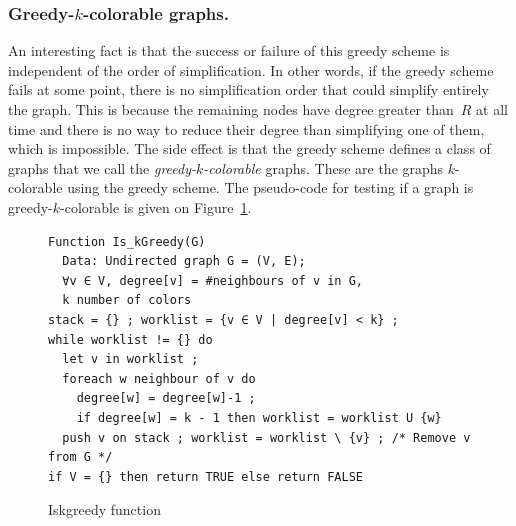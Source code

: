 {\subsubsection{Greedy-$k$-colorable graphs.}

An interesting fact is that the success or failure of this greedy scheme is 
independent of the order of simplification. In other words, if the greedy 
scheme fails at some point, there is no simplification order that could 
simplify entirely the graph. This is because the remaining nodes have degree 
greater than~$R$ at all time and there is no way to reduce their degree than 
simplifying one of them, which is impossible. The side effect is that the 
greedy scheme defines a class of graphs that we call the 
\emph{greedy-$k$-colorable} graphs. These are the graphs $k$-colorable using 
the greedy scheme. The pseudo-code for testing if a graph is 
greedy-$k$-colorable is given on Figure~\ref{code:is-k-greedy}.

\begin{figure}
\begin{verbatim}
Function Is_kGreedy(G)
  Data: Undirected graph G = (V, E);
  ∀v ∈ V, degree[v] = #neighbours of v in G,
  k number of colors
stack = {} ; worklist = {v ∈ V | degree[v] < k} ;
while worklist != {} do
  let v in worklist ;
  foreach w neighbour of v do
    degree[w] = degree[w]-1 ;
    if degree[w] = k - 1 then worklist = worklist U {w}
  push v on stack ; worklist = worklist \ {v} ; /* Remove v from G */
if V = {} then return TRUE else return FALSE
\end{verbatim}
\caption{Iskgreedy function}
\label{code:is-k-greedy}
\end{figure}

}
